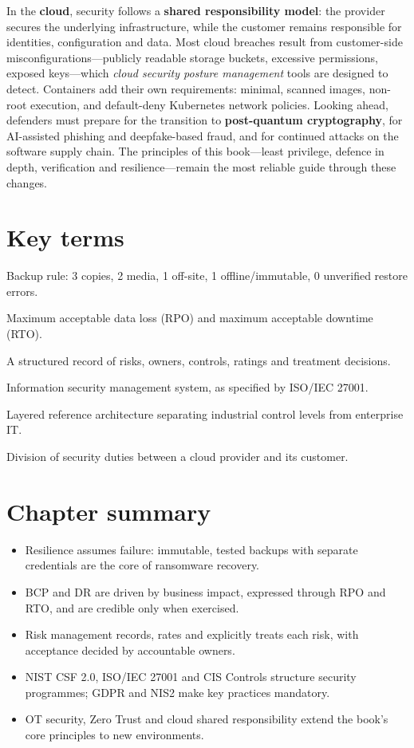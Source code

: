 In the \textbf{cloud}, security follows a \textbf{shared responsibility model}: the provider secures the underlying infrastructure, while the customer remains responsible for identities, configuration and data. Most cloud breaches result from customer-side misconfigurations—publicly readable storage buckets, excessive permissions, exposed keys—which \emph{cloud security posture management} tools are designed to detect. Containers add their own requirements: minimal, scanned images, non-root execution, and default-deny Kubernetes network policies. Looking ahead, defenders must prepare for the transition to \textbf{post-quantum cryptography}, for AI-assisted phishing and deepfake-based fraud, and for continued attacks on the software supply chain. The principles of this book—least privilege, defence in depth, verification and resilience—remain the most reliable guide through these changes.

\section*{Key terms}
\begin{description}[style=nextline,leftmargin=1.2em]
  \item[3-2-1-1-0] Backup rule: 3 copies, 2 media, 1 off-site, 1 offline/immutable, 0 unverified restore errors.
  \item[RPO / RTO] Maximum acceptable data loss (RPO) and maximum acceptable downtime (RTO).
  \item[Risk register] A structured record of risks, owners, controls, ratings and treatment decisions.
  \item[ISMS] Information security management system, as specified by ISO/IEC 27001.
  \item[Purdue model] Layered reference architecture separating industrial control levels from enterprise IT.
  \item[Shared responsibility] Division of security duties between a cloud provider and its customer.
\end{description}

\section*{Chapter summary}
\begin{itemize}
  \item Resilience assumes failure: immutable, tested backups with separate credentials are the core of ransomware recovery.
  \item BCP and DR are driven by business impact, expressed through RPO and RTO, and are credible only when exercised.
  \item Risk management records, rates and explicitly treats each risk, with acceptance decided by accountable owners.
  \item NIST CSF 2.0, ISO/IEC 27001 and CIS Controls structure security programmes; GDPR and NIS2 make key practices mandatory.
  \item OT security, Zero Trust and cloud shared responsibility extend the book's core principles to new environments.
\end{itemize}

